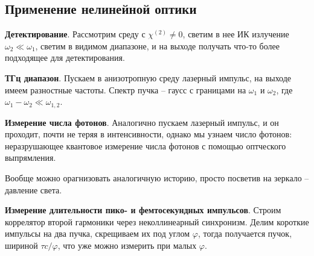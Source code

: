 





\subsection{Применение нелинейной оптики}


\textbf{Детектирование}. 
Рассмотрим среду с $\chi^{(2)} \neq 0$, светим в нее ИК излучение $\omega_2 \ll \omega_1$, светим в видимом диапазоне, и на выходе получать что-то более подходящее для детектирования. 




\textbf{ТГц диапазон}. 
Пускаем в анизотропную среду лазерный импульс, на выходе имеем разностные частоты. Спектр пучка -- гаусс с границами на $\omega_1$ и $\omega_2$, где $\omega_1 - \omega_2 \ll \omega_{1,2}$.



\textbf{Измерение числа фотонов}. Аналогично пускаем лазерный импульс, и он проходит, почти не теряя в интенсивности, однако мы узнаем число фотонов: неразрушающее квантовое измерение числа фотонов с помощью оптческого выпрямления. 

Вообще можно орагнизовать аналогичную историю, просто посветив на зеркало -- давление света. 





\textbf{Измерение длительности пико- и фемтосекундных импульсов}. 
Строим коррелятор второй гармоники через неколлинеарный синхронизм. Делим короткие импульсы на два пучка, скрещиваем их под углом $\varphi$, тогда получается пучок, шириной $\tau c / \varphi$, что уже можно измерить при малых $\varphi$. 




